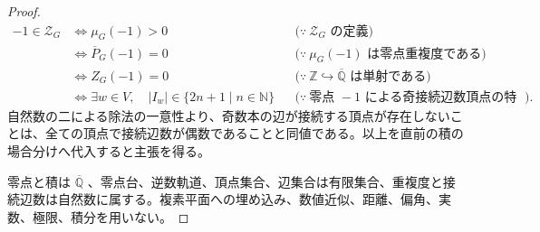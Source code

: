 \documentclass[11pt,a4paper]{article}
\theoremstyle{remark}
\begin{document}
\begin{proof}
\[\begin{aligned}
-1\in\mathcal Z_G
&\Longleftrightarrow\mu_G(-1)>0
&&\bigl(\because\ \mathcal Z_G\text{ の定義}\bigr)\\
&\Longleftrightarrow\overline P_G(-1)=0
&&\bigl(\because\ \mu_G(-1)\text{ は零点重複度である}\bigr)\\
&\Longleftrightarrow Z_G(-1)=0
&&\bigl(\because\ \mathbb Z\hookrightarrow\overline{\mathbb Q}\text{ は単射である}\bigr)\\
&\Longleftrightarrow\exists w\in V,\quad |I_w|\in\{2n+1\mid n\in\mathbb N\}
&&\bigl(\because\ \text{零点 }-1\text{ による奇接続辺数頂点の特徴付け}\bigr).
\end{aligned}\]
自然数の二による除法の一意性より、奇数本の辺が接続する頂点が存在しないことは、全ての頂点で接続辺数が偶数であることと同値である。以上を直前の積の場合分けへ代入すると主張を得る。

零点と積は 
$\overline{\mathbb Q}$
、零点台、逆数軌道、頂点集合、辺集合は有限集合、重複度と接続辺数は自然数に属する。複素平面への埋め込み、数値近似、距離、偏角、実数、極限、積分を用いない。

\end{proof}
\end{document}
